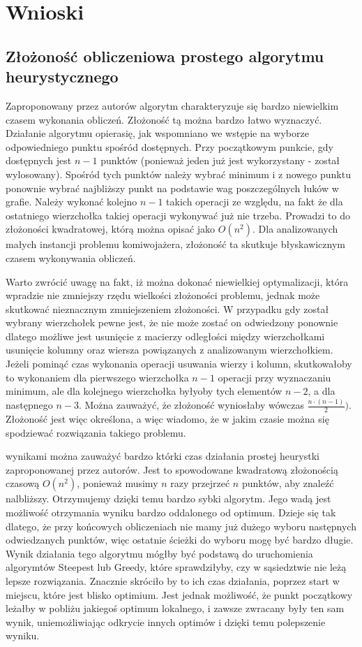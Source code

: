 \section{Wnioski}

\subsection{Złożoność obliczeniowa prostego algorytmu heurystycznego}

Zaproponowany przez autorów algorytm charakteryzuje się bardzo niewielkim
czasem wykonania obliczeń. Złożoność tą można bardzo łatwo wyznaczyć.
Działanie algorytmu opierasię, jak wspomniano we wstępie na wyborze
odpowiedniego punktu spośród dostępnych. Przy początkowym punkcie, gdy
dostępnych jest $n - 1$ punktów (ponieważ jeden już jest wykorzystany - 
został wylosowany). Spośród tych punktów należy wybrać minimum i
z nowego punktu ponownie wybrać najbliższy punkt na podstawie wag
poszczególnych łuków w grafie. Należy wykonać kolejno $n - 1$
takich operacji ze względu, na fakt że dla ostatniego 
wierzchołka takiej operacji wykonywać już nie trzeba. Prowadzi to do
złożoności kwadratowej, którą można opisać jako $ O(n^{2}) $.
Dla analizowanych małych instancji problemu komiwojażera, złożoność ta
skutkuje błyskawicznym czasem wykonywania obliczeń.

Warto zwrócić uwagę na fakt, iż można dokonać niewielkiej optymalizacji,
która wpradzie nie zmniejszy rzędu wielkości złożoności problemu, jednak
może skutkować nieznacznym zmniejszeniem złożoności. W przypadku gdy został
wybrany wierzchołek pewne jest, że nie może zostać on odwiedzony ponownie
dlatego możliwe jest usunięcie z macierzy odległości między
wierzchołkami usunięcie kolumny oraz wiersza powiązanych z
analizowanym wierzchołkiem. Jeżeli pominąć czas wykonania
operacji usuwania wierzy i kolumn, skutkowałoby to wykonaniem dla pierwszego
wierzchołka $n - 1$ operacji przy wyznaczaniu minimum, ale dla kolejnego
wierzchołka byłyoby tych elementów $n - 2$, a dla następnego $n - 3$.
Można zauważyć, że złożoność wyniosłaby wówczas $\frac{n \cdot (n - 1)}{2})$.
Złożoność jest więc określona, a więc wiadomo, że w jakim czasie
można się spodziewać rozwiązania takiego problemu.


wynikami można zauważyć bardzo którki czas działania prostej
heurystki zaproponowanej przez autorów. Jest to spowodowane kwadratową złożonością 
czasową $ O(n^{2}) $, ponieważ musimy $ n $ razy przejrzeć $ n $ punktów, aby znaleźć
nalbliższy. Otrzymujemy dzięki temu bardzo sybki algorytm. Jego wadą jest 
możliwość otrzymania wyniku bardzo oddalonego od optimum. Dzieje się tak dlatego, 
że przy końcowych obliczeniach nie mamy już dużego wyboru następnych odwiedzanych 
punktów, więc ostatnie ścieżki do wyboru mogę być bardzo długie. Wynik działania 
tego algorytmu mógłby być podstawą do uruchomienia algorymtów Steepest lub Greedy, 
które sprawdziłyby, czy w sąsiedztwie nie leżą lepsze rozwiązania. Znacznie skróciło
by to ich czas działania, poprzez start w miejscu, które jest blisko optimium.
Jest jednak możliwość, że punkt początkowy leżałby w pobliżu jakiegoś optimum 
lokalnego, i zawsze zwracany były ten sam wynik, uniemożliwiając odkrycie innych 
optimów i dzięki temu polepszenie wyniku.

